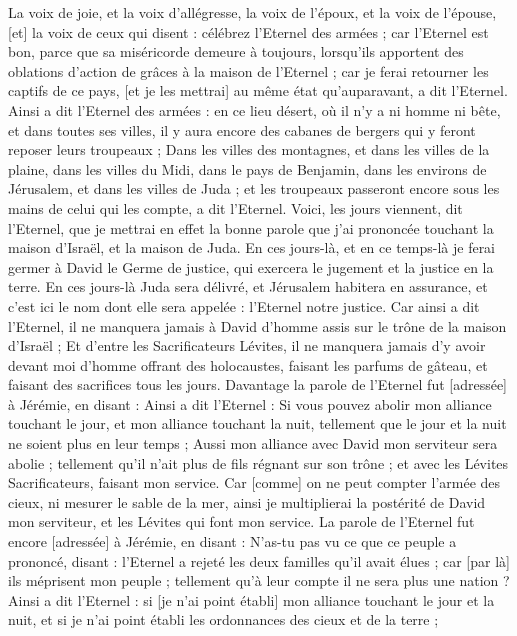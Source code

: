 \begin{multicols}{2}
La voix de joie, et la voix d'allégresse, la voix de l'époux, et la voix de l'épouse, [et] la voix de ceux qui disent : célébrez l'Eternel des armées ; car l'Eternel est bon, parce que sa miséricorde demeure à toujours, lorsqu'ils apportent des oblations d'action de grâces à la maison de l'Eternel ; car je ferai retourner les captifs de ce pays, [et je les mettrai] au même état qu'auparavant, a dit l'Eternel.
Ainsi a dit l'Eternel des armées : en ce lieu désert, où il n'y a ni homme ni bête, et dans toutes ses villes, il y aura encore des cabanes de bergers qui y feront reposer leurs troupeaux ;
Dans les villes des montagnes, et dans les villes de la plaine, dans les villes du Midi, dans le pays de Benjamin, dans les environs de Jérusalem, et dans les villes de Juda ; et les troupeaux passeront encore sous les mains de celui qui les compte, a dit l'Eternel.
Voici, les jours viennent, dit l'Eternel, que je mettrai en effet la bonne parole que j'ai prononcée touchant la maison d'Israël, et la maison de Juda.
En ces jours-là, et en ce temps-là je ferai germer à David le Germe de justice, qui exercera le jugement et la justice en la terre.
En ces jours-là Juda sera délivré, et Jérusalem habitera en assurance, et c'est ici le nom dont elle sera appelée : l'Eternel notre justice.
Car ainsi a dit l'Eternel, il ne manquera jamais à David d'homme assis sur le trône de la maison d'Israël ;
Et d'entre les Sacrificateurs Lévites, il ne manquera jamais d'y avoir devant moi d'homme offrant des holocaustes, faisant les parfums de gâteau, et faisant des sacrifices tous les jours.
Davantage la parole de l'Eternel fut [adressée] à Jérémie, en disant :
Ainsi a dit l'Eternel : Si vous pouvez abolir mon alliance touchant le jour, et mon alliance touchant la nuit, tellement que le jour et la nuit ne soient plus en leur temps ;
Aussi mon alliance avec David mon serviteur sera abolie ; tellement qu'il n'ait plus de fils régnant sur son trône ; et avec les Lévites Sacrificateurs, faisant mon service.
Car [comme] on ne peut compter l'armée des cieux, ni mesurer le sable de la mer, ainsi je multiplierai la postérité de David mon serviteur, et les Lévites qui font mon service.
La parole de l'Eternel fut encore [adressée] à Jérémie, en disant :
N'as-tu pas vu ce que ce peuple a prononcé, disant : l'Eternel a rejeté les deux familles qu'il avait élues ; car [par là] ils méprisent mon peuple ; tellement qu'à leur compte il ne sera plus une nation ?
Ainsi a dit l'Eternel : si [je n'ai point établi] mon alliance touchant le jour et la nuit, et si je n'ai point établi les ordonnances des cieux et de la terre ;

\end{multicols}
